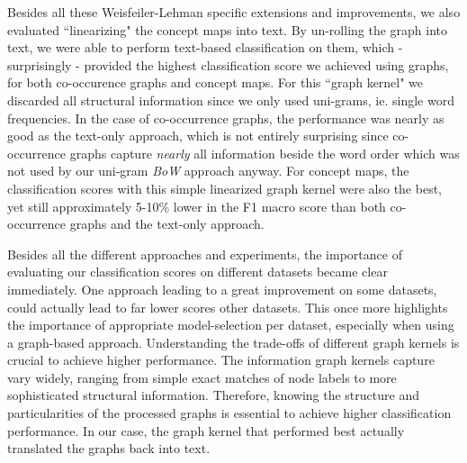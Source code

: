 Besides all these Weisfeiler-Lehman specific extensions and improvements, we also evaluated ``linearizing" the concept maps into text.
By un-rolling the graph into text, we were able to perform text-based classification on them, which - surprisingly - provided the highest classification score we achieved using graphs, for both co-occurence graphs and concept maps.
For this ``graph kernel" we discarded all structural information since we only used uni-grams, ie. single word frequencies.
In the case of co-occurrence graphs, the performance was nearly as good as the text-only approach, which is not entirely surprising since co-occurrence graphs capture \textit{nearly} all information beside the word order which was not used by our uni-gram \textit{BoW} approach anyway.
For concept maps, the classification scores with this simple linearized graph kernel were also the best, yet still approximately 5-10\% lower in the F1 macro score than both co-occurrence graphs and the text-only approach.

Besides all the different approaches and experiments, the importance of evaluating our classification scores on different datasets became clear immediately.
One approach leading to a great improvement on some datasets, could actually lead to far lower scores other datasets.
This once more highlights the importance of appropriate model-selection per dataset, especially when using a graph-based approach.
Understanding the trade-offs of different graph kernels is crucial to achieve higher performance.
The information graph kernels capture vary widely, ranging from simple exact matches of node labels to more sophisticated structural information.
Therefore, knowing the structure and particularities of the processed graphs is essential to achieve higher classification performance.
In our case, the graph kernel that performed best actually translated the graphs back into text.

